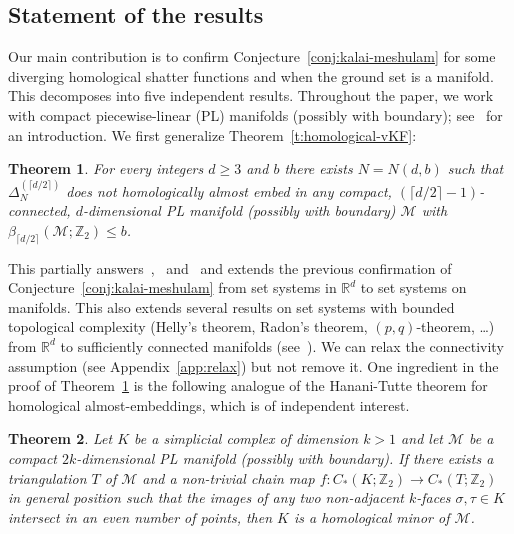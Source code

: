\documentclass[11pt]{article}
\newcommand{\R}{\mathbb{R}}
\newcommand{\Z}{\mathbb{Z}}
\newcommand{\M}{\mathcal{M}}
\newtheorem{theorem}{Theorem}
\begin{document}
\subsection{Statement of the results}\label{s:results}
%
Our main contribution is to confirm Conjecture~\ref{conj:kalai-meshulam} for some diverging homological shatter functions and when the ground set is a manifold. This decomposes into five independent results.
%
\medskip
%
Throughout the paper, we work with compact piecewise-linear (PL) manifolds (possibly with  boundary); see~\cite[$\mathsection 1$]{Rourke1972IntroductionTP} for an introduction. We first generalize Theorem~\ref{t:homological-vKF}:
%
\begin{theorem}\label{t:forbidden}
For every integers $d \ge 3$ and $b$ there exists $N=N(d,b)$ such that $\Delta_{N}^{(\lceil d/2 \rceil)}$ does not homologically almost embed in any compact, $(\lceil d/2 \rceil-1)$-connected, $d$-dimensional PL manifold (possibly with boundary) $\M$ with $\beta_{\lceil d/2 \rceil}(\M;\Z_2) \le b$.
\end{theorem}
%
\noindent
This partially answers~\cite[Problem~3]{patakova2022bounding},~\cite[Conjecture~1.7]{steppingUp} and~\cite[Conjecture~2]{patak2025sharper} and extends the previous confirmation of Conjecture~\ref{conj:kalai-meshulam} from set systems in $\R^d$ to set systems on manifolds. This also extends several results on set systems with bounded topological complexity (Helly's theorem, Radon's theorem, $(p,q)$-theorem, \ldots) from $\R^d$ to sufficiently connected manifolds (see~\cite{patakova2022bounding,steppingUp}). We can relax the connectivity assumption (see Appendix~\ref{app:relax}) but not remove it.
%
\medskip
%
 One ingredient in the proof of Theorem~\ref{t:forbidden} is the following analogue of the Hanani-Tutte theorem for homological almost-embeddings, which is of independent interest.
%

\begin{theorem}\label{t:HT}
  Let $K$ be a simplicial complex of dimension $k>1$ and let $\M$ be a compact
  $2k$-dimensional PL manifold (possibly with boundary). If there exists a triangulation $T$ of $\M$ and a non-trivial chain map $f:C_*(K; \Z_2)\to C_*(T; \Z_2)$ in
  general position such that the images of any two non-adjacent
  $k$-faces $\sigma,\tau\in K$ intersect in an even number of points,
  then $K$ is a homological minor of $\mathcal{M}$.
\end{theorem}
\end{document}
